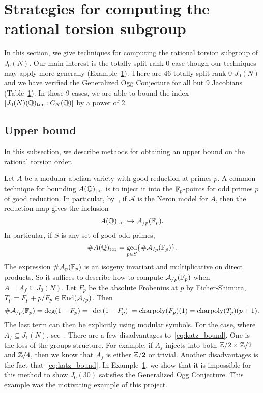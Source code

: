 \documentclass[11pt, proquest]{uwthesis}
\begin{document}
\section{Strategies for computing the rational torsion subgroup}

In this section, we give techniques for computing the rational torsion subgroup
of $J_0(N)$. Our main interest is the totally split rank-0 case
though our techniques may apply more generally (Example~\ref{}). There are 46
totally split rank 0 $J_0(N)$ and we have verified the Generalized Ogg
Conjecture for all but 9 Jacobians (Table~\ref{}). In those 9 cases, we are
able to bound the index $[J_0(N)(\mathbb{Q})_{\mathrm{tor}}:C_N(\mathbb{Q})]$ by a power of 2.

\subsection{Upper bound}%
\label{sub:upper_bound}

In this subsection, we describe methods for obtaining an upper bound on the
rational torsion order. 

Let $A$ be a modular abelian variety with good reduction at primes $p$. A
common technique for bounding $A(\mathbb{Q})_{\mathrm{tor}}$ is to inject it into the
$\mathbb{F}_p$-points for odd primes $p$ of good reduction. In particular,
by~\cite[Appendix]{katz:torsion}, if $\mathcal{A}$ is the Neron model for $A$,
then the reduction map gives the inclusion
\[
    A(\mathbb{Q})_{\mathrm{tor}} \hookrightarrow \mathcal{A}_{/p}(\mathbb{F}_p).
\]
In particular, if $S$ is any set of good odd primes,
\[
    \# A(\mathbb{Q})_{\mathrm{tor}} = \gcd_{p\in S}\{ \# \mathcal{A}_{/p}(\mathbb{F}_p)\}.
\]
The expression $\#\mathcal{A}_{\mathfrak{p}}(\mathbb{F}_p)$ is an isogeny invariant and
multiplicative on direct products. So it suffices to describe how to compute
$\mathcal{A}_{/p}(\mathbb{F}_p)$ when $A=A_f\subseteq J_0(N)$. Let $F_p$ be the absolute
Frobenius at $p$ by Eicher-Shimura, $T_p = F_p + p/F_p\in
\operatorname{End}(\mathcal{A}_{/p})$. Then
\begin{equation}
    \label{eq:katz_bound}
    \#\mathcal{A}_{/p}(\mathbb{F}_p)=\deg(1-F_p)=|\det(1-F_p)|=\mathrm{charpoly}(F_p)(1)
    = \mathrm{charpoly}(T_p)(p+1).
\end{equation}
The last term can then be explicitly using modular symbols. For the case, where
$A_f\subseteq J_1(N)$, see~\cite[\S 3.5]{agashe-stein:bsd}. There are a few
disadvantages to~\eqref{eq:katz_bound}. One is the loss of the groups
structure. For example, if $A_f$ injects into both $\mathbb{Z}/2\times \mathbb{Z}/2$ and
$\mathbb{Z}/4$, then we know that $A_f$ is either $\mathbb{Z}/2$ or trivial. Another
disadvantages is the fact that~\eqref{eq:katz_bound}. In Example~\ref{}, we
show that it is impossible for this method to show $J_0(30)$ satisfies the
Generalized Ogg Conjecture. This example was the motivating example of this
project.
\end{document}
